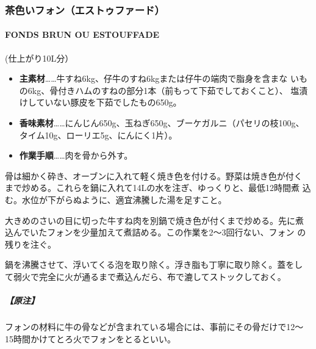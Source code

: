 \documentclass[twoside,12Q,b5j]{escoffierltjsbook}
\newenvironment{recette}{\begin{small}\begin{spacing}{1}\begin{multicols}{2}}{\end{multicols}\end{spacing}\end{small}}
\begin{document}
\begin{recette}
\subsubsection{茶色いフォン（エストゥファード）}\label{ux8336ux8272ux3044ux30d5ux30a9ux30f3ux30a8ux30b9ux30c8ux30a5ux30d5ux30a1ux30fcux30c9}

\paragraph{FONDS BRUN OU ESTOUFFADE}\label{fonds-brun-ou-estouffade}


(仕上がり10L分）

\begin{itemize}
\item
  \textbf{主素材}\ldots{}\ldots{}牛すね6kg、仔牛のすね6kgまたは仔牛の端肉で脂身を含まな
  いもの6kg、骨付きハムのすねの部分1本（前もって下茹でしておくこと）、
  塩漬けしていない豚皮を下茹でしたもの650g。
\item
  \textbf{香味素材}\ldots{}\ldots{}にんじん650g、玉ねぎ650g、ブーケガルニ（パセリの枝100g、
  タイム10g、ローリエ5g、にんにく1片）。
\item
  \textbf{作業手順}\ldots{}\ldots{}肉を骨から外す。
\end{itemize}

骨は細かく砕き、オーブンに入れて軽く焼き色を付ける。野菜は焼き色が付く
まで炒める。これらを鍋に入れて14Lの水を注ぎ、ゆっくりと、最低12時間煮
込む。水位が下がらぬように、適宜沸騰した湯を足すこと。

大きめのさいの目に切った牛すね肉を別鍋で焼き色が付くまで炒める。先に煮
込んでいたフォンを少量加えて煮詰める。この作業を2〜3回行ない、フォン
の残りを注ぐ。

鍋を沸騰させて、浮いてくる泡を取り除く。浮き脂も丁寧に取り除く。蓋をし
て弱火で完全に火が通るまで煮込んだら、布で漉してストックしておく。

\subparagraph{【原注】}\label{ux539fux6ce8}

フォンの材料に牛の骨などが含まれている場合には、事前にその骨だけで12〜
15時間かけてとろ火でフォンをとるといい。


\end{recette}
\end{document}
